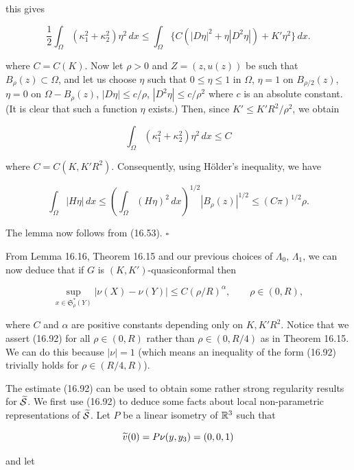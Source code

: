 this gives

\[
\frac12\int_{\Omega}(\kappa_1^2+\kappa_2^2)\eta^2\,dx \leq \int_{\Omega} \{C(|D\eta|^2+\eta|D^2\eta|)+K'\eta^2\}\,dx.
\]






where $C = C(K)$. Now let $\rho > 0$ and $Z = (z, u(z))$ be such that $B_{\rho}(z) \subset \Omega$, and let us choose $\eta$ such that $0 \leq \eta \leq 1$ in $\Omega$, $\eta = 1$ on $B_{\rho/2}(z)$, $\eta = 0$ on $\Omega - B_{\rho}(z)$, $|D\eta| \leq c/\rho$, $|D^2\eta| \leq c/\rho^2$ where $c$ is an absolute constant. (It is clear that such a function $\eta$ exists.) Then, since $K' \leq K'R^2/\rho^2$, we obtain

\begin{equation}
\tag{16.91}
\int_{\Omega} (\kappa_1^2 + \kappa_2^2)\eta^2\,dx \leq C
\end{equation}

where $C = C(K, K'R^2)$. Consequently, using H\"older's inequality, we have

\[
\int_{\Omega} |H\eta|\,dx \leq \left(\int_{\Omega} (H\eta)^2\,dx\right)^{1/2} |B_{\rho}(z)|^{1/2}
\leq (C\pi)^{1/2}\rho.
\]

The lemma now follows from (16.53). $\square$

From Lemma 16.16, Theorem 16.15 and our previous choices of $\Lambda_0$, $\Lambda_1$, we can now deduce that if $G$ is $(K, K')$-quasiconformal then

\begin{equation}
\tag{16.92}
\sup_{x \in \mathfrak{S}_{\rho}^*(Y)} |\nu(X) - \nu(Y)| \leq C(\rho/R)^{\alpha}, \qquad \rho \in (0, R),
\end{equation}

where $C$ and $\alpha$ are positive constants depending only on $K, K'R^2$. Notice that we assert (16.92) for all $\rho \in (0, R)$ rather than $\rho \in (0, R/4)$ as in Theorem 16.15. We can do this because $|\nu| = 1$ (which means an inequality of the form (16.92) trivially holds for $\rho \in (R/4, R)$).

The estimate (16.92) can be used to obtain some rather strong regularity results for $\widetilde{\mathcal{S}}$. We first use (16.92) to deduce some facts about local non-parametric representations of $\widetilde{\mathcal{S}}$. Let $P$ be a linear isometry of $\mathbb{R}^3$ such that

\[
\widetilde{v}(0) = P\nu(y, y_3) = (0, 0, 1)
\]

and let

